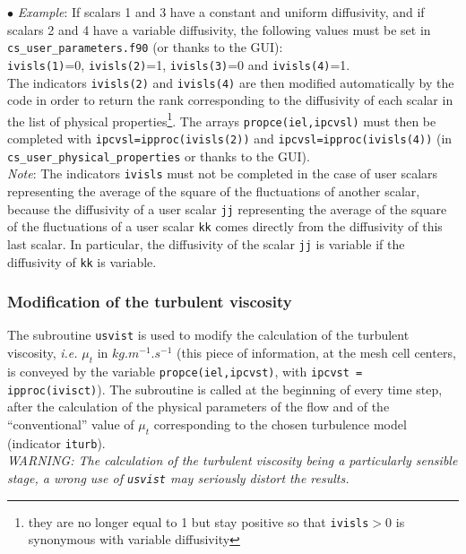 {{{\begin{list}{$\bullet$}{}
{\em Example}: If scalars 1 and 3 have a constant and uniform
      diffusivity, and if scalars 2 and 4 have a variable diffusivity,
      the following values must be set in \texttt{cs\_user\_parameters.f90} (or thanks to the GUI): \\
      \texttt{ivisls(1)}=0, \texttt{ivisls(2)}=1, \texttt{ivisls(3)}=0
      and \texttt{ivisls(4)}=1. \\
      The indicators \texttt{ivisls(2)} and \texttt{ivisls(4)} are then
      modified automatically by the code in order to return the rank
      corresponding to the diffusivity of each scalar in the list of physical
      properties\footnote{they are no longer equal to 1 but stay positive
      so that \texttt{ivisls}$>$0 is synonymous with variable diffusivity}.
      The arrays \mbox{\texttt{propce(iel,ipcvsl)}} must
      then be completed with \texttt{ipcvsl=ipproc(ivisls(2))} and
      \texttt{ipcvsl=ipproc(ivisls(4))} (in \texttt{cs\_user\_physical\_properties} or thanks to the GUI). \\

{\em Note}: The indicators \texttt{ivisls} must not be completed in the case of
      user scalars representing the average of the square of the
      fluctuations of another scalar, because the diffusivity of a user
      scalar \texttt{jj} representing the average of the square of the
      fluctuations of a user scalar \texttt{kk} comes directly from the
      diffusivity of this last scalar. In particular, the diffusivity
      of the scalar \texttt{jj} is variable if the diffusivity of \texttt{kk}
      is variable.
\end{list}


\subsubsection{Modification of the turbulent viscosity}

The subroutine \texttt{usvist} is used to modify the calculation of the turbulent
viscosity, {\em i.e.} $\mu_t$ in $kg.m^{-1}.s^{-1}$
(this piece of information, at the mesh cell centers, is conveyed by the
variable \texttt{propce(iel,ipcvst)}, with
\texttt{ipcvst =  ipproc(ivisct)}). The
subroutine is called at the beginning of every time step, after the
calculation of the physical parameters of the flow and of the
``conventional'' value of $\mu_t$ corresponding to the chosen turbulence
model (indicator \texttt{iturb}).\\
{\em WARNING: The calculation of the turbulent viscosity being a
particularly sensible stage, a wrong use of {\em\texttt{usvist}} may
seriously distort the results.}

}}}
